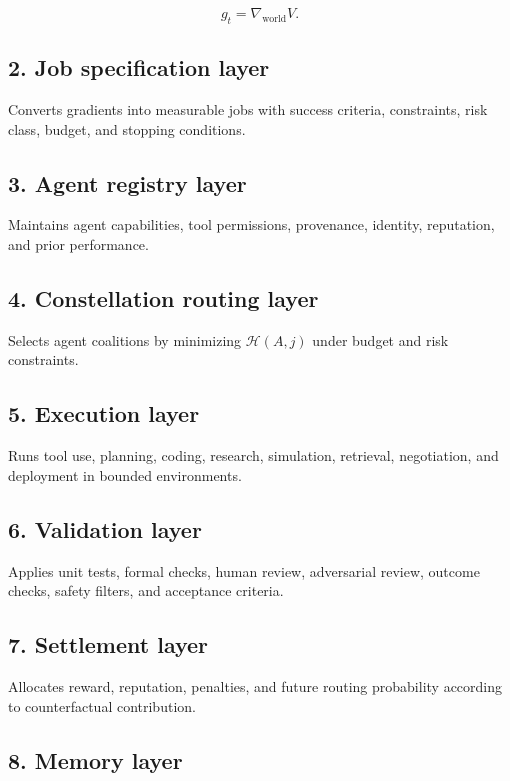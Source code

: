 \[
g_t=\nabla_{\text{world}}V.
\]

\subsection{2. Job specification layer}\label{job-specification-layer}

Converts gradients into measurable jobs with success criteria,
constraints, risk class, budget, and stopping conditions.

\subsection{3. Agent registry layer}\label{agent-registry-layer}

Maintains agent capabilities, tool permissions, provenance, identity,
reputation, and prior performance.

\subsection{4. Constellation routing
layer}\label{constellation-routing-layer}

Selects agent coalitions by minimizing \(\mathcal{H}(A,j)\) under budget
and risk constraints.

\subsection{5. Execution layer}\label{execution-layer}

Runs tool use, planning, coding, research, simulation, retrieval,
negotiation, and deployment in bounded environments.

\subsection{6. Validation layer}\label{validation-layer}

Applies unit tests, formal checks, human review, adversarial review,
outcome checks, safety filters, and acceptance criteria.

\subsection{7. Settlement layer}\label{settlement-layer}

Allocates reward, reputation, penalties, and future routing probability
according to counterfactual contribution.

\subsection{8. Memory layer}\label{memory-layer}

